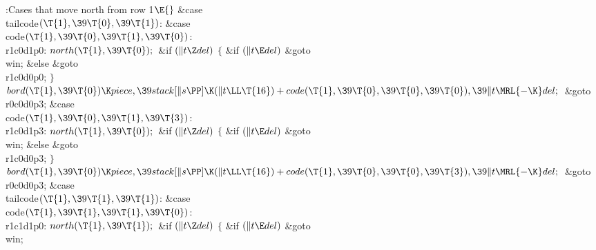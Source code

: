 \B{}:Cases that move north from row 1\X${}\E{}$\6
\4\&{case} \\{tailcode}${}(\T{1},\39\T{0},\39\T{1}){}$:\5
\&{case} \\{code}${}(\T{1},\39\T{0},\39\T{1},\39\T{0}){}$:\5
\\{r1c0d1p0}:\5
${}\\{north}(\T{1},\39\T{0});{}$\6
\&{if} ${}(\|t\Z\\{del}){}$\5
${}\{{}$\5
\1\&{if} ${}(\|t\E\\{del}){}$\1\5
\&{goto} \\{win};\5
\2\&{else}\1\5
\&{goto} \\{r1c0d0p0};\5
\2${}\}{}$\2\6
${}\\{bord}(\T{1},\39\T{0})\K\\{piece},\39\\{stack}[\|s\PP]\K(\|t\LL\T{16})+%
\\{code}(\T{1},\39\T{0},\39\T{0},\39\T{0}),\39\|t\MRL{-{\K}}\\{del};{}$\6
\&{goto} \\{r0c0d0p3};\6
\4\&{case} \\{code}${}(\T{1},\39\T{0},\39\T{1},\39\T{3}){}$:\5
\\{r1c0d1p3}:\5
${}\\{north}(\T{1},\39\T{0});{}$\6
\&{if} ${}(\|t\Z\\{del}){}$\5
${}\{{}$\5
\1\&{if} ${}(\|t\E\\{del}){}$\1\5
\&{goto} \\{win};\5
\2\&{else}\1\5
\&{goto} \\{r1c0d0p3};\5
\2${}\}{}$\2\6
${}\\{bord}(\T{1},\39\T{0})\K\\{piece},\39\\{stack}[\|s\PP]\K(\|t\LL\T{16})+%
\\{code}(\T{1},\39\T{0},\39\T{0},\39\T{3}),\39\|t\MRL{-{\K}}\\{del};{}$\6
\&{goto} \\{r0c0d0p3};\6
\4\&{case} \\{tailcode}${}(\T{1},\39\T{1},\39\T{1}){}$:\5
\&{case} \\{code}${}(\T{1},\39\T{1},\39\T{1},\39\T{0}){}$:\5
\\{r1c1d1p0}:\5
${}\\{north}(\T{1},\39\T{1});{}$\6
\&{if} ${}(\|t\Z\\{del}){}$\5
${}\{{}$\5
\1\&{if} ${}(\|t\E\\{del}){}$\1\5
\&{goto} \\{win};\5
